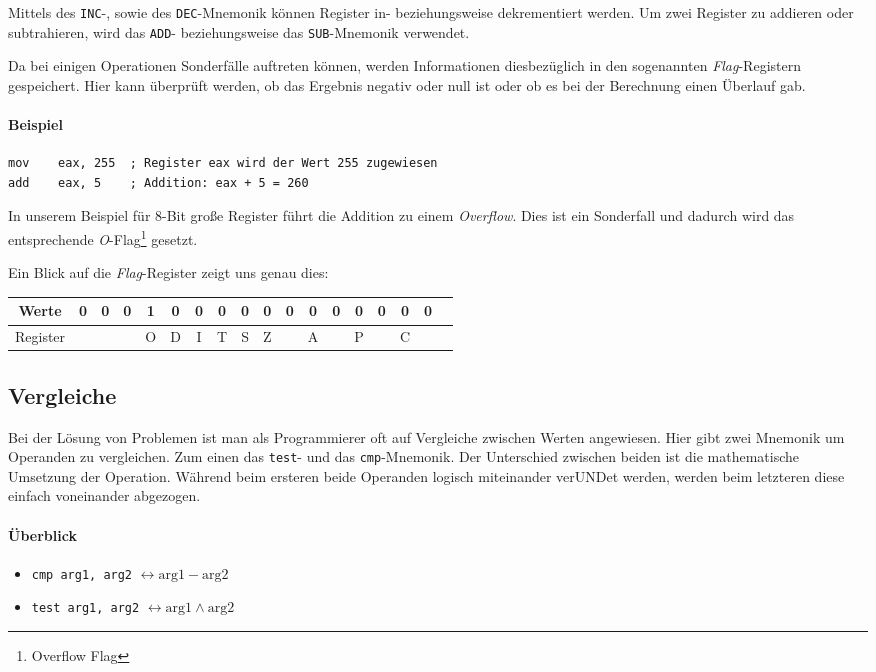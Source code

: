 Mittels des \texttt{INC}-, sowie des \texttt{DEC}-Mnemonik können Register in- beziehungsweise dekrementiert werden. Um zwei Register zu addieren oder subtrahieren, wird das \texttt{ADD}- beziehungsweise das \texttt{SUB}-Mnemonik verwendet.

Da bei einigen Operationen Sonderfälle auftreten können, werden Informationen diesbezüglich in den sogenannten \textit{Flag}-Registern gespeichert.
Hier kann überprüft werden, ob das Ergebnis negativ oder null ist oder ob es bei der Berechnung einen Überlauf gab.

\paragraph{Beispiel\newline}\makebox{}

\begin{lstlisting}
mov    eax, 255  ; Register eax wird der Wert 255 zugewiesen
add    eax, 5    ; Addition: eax + 5 = 260
\end{lstlisting}

In unserem Beispiel für 8-Bit große Register führt die Addition zu einem \textit{Overflow}.
Dies ist ein Sonderfall und dadurch wird das entsprechende \textit{O}-Flag\footnote{Overflow Flag} gesetzt.

Ein Blick auf die \textit{Flag}-Register zeigt uns genau dies:

\begin{tabular}{|c|c|c|c|c|c|c|c|c|c|c|c|c|c|c|c|c|c|}
\hline Werte & 0 & 0 & 0 & 1 & 0 & 0 & 0 & 0 & 0 & 0 & 0 & 0 & 0 & 0 & 0 & 0 \\
\hline Register & & & & O & D & I & T & S & Z & & A & & P & & C & \\
\hline
\end{tabular}

\subsection{Vergleiche}
Bei der Lösung von Problemen ist man als Programmierer oft auf Vergleiche zwischen Werten angewiesen.
Hier gibt zwei Mnemonik um Operanden zu vergleichen. Zum einen das \texttt{test}- und das \texttt{cmp}-Mnemonik.
Der Unterschied zwischen beiden ist die mathematische Umsetzung der Operation. Während beim ersteren beide Operanden logisch miteinander verUNDet werden, werden beim letzteren diese einfach voneinander abgezogen.

\paragraph{Überblick}
\begin{itemize}
    \item \texttt{cmp arg1, arg2} $\leftrightarrow \text{arg1} - \text{arg2}$

    \item \texttt{test arg1, arg2} $\leftrightarrow \text{arg1} \wedge \text{arg2}$
\end{itemize}

